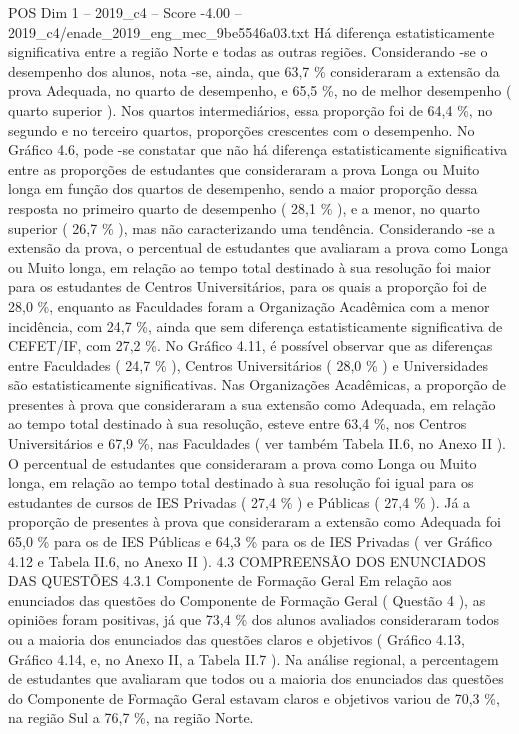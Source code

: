 \begin{textsample}{POS Dim 1 – 2019\_c4 – Score -4.00 – 2019\_c4/enade\_2019\_eng\_mec\_9be5546a03.txt}
Há diferença estatisticamente significativa entre a região Norte e todas as outras regiões.
Considerando -se o desempenho dos alunos, nota -se, ainda, que 63,7 \% consideraram a extensão da prova Adequada, no quarto de desempenho, e 65,5 \%, no de melhor desempenho ( quarto superior ).
Nos quartos intermediários, essa proporção foi de 64,4 \%, no segundo e no terceiro quartos, proporções crescentes com o desempenho.
No Gráfico 4.6, pode -se constatar que não há diferença estatisticamente significativa entre as proporções de estudantes que consideraram a prova Longa ou Muito longa em função dos quartos de desempenho, sendo a maior proporção dessa resposta no primeiro quarto de desempenho ( 28,1 \% ), e a menor, no quarto superior ( 26,7 \% ), mas não caracterizando uma tendência.
Considerando -se a extensão da prova, o percentual de estudantes que avaliaram a prova como Longa ou Muito longa, em relação ao tempo total destinado à sua resolução foi maior para os estudantes de Centros Universitários, para os quais a proporção foi de 28,0 \%, enquanto as Faculdades foram a Organização Acadêmica com a menor incidência, com 24,7 \%, ainda que sem diferença estatisticamente significativa de CEFET/IF, com 27,2 \%.
No Gráfico 4.11, é possível observar que as diferenças entre Faculdades ( 24,7 \% ), Centros Universitários ( 28,0 \% ) e Universidades são estatisticamente significativas.
Nas Organizações Acadêmicas, a proporção de presentes à prova que consideraram a sua extensão como Adequada, em relação ao tempo total destinado à sua resolução, esteve entre 63,4 \%, nos Centros Universitários e 67,9 \%, nas Faculdades ( ver também Tabela II.6, no Anexo II ).
O percentual de estudantes que consideraram a prova como Longa ou Muito longa, em relação ao tempo total destinado à sua resolução foi igual para os estudantes de cursos de IES Privadas ( 27,4 \% ) e Públicas ( 27,4 \% ).
Já a proporção de presentes à prova que consideraram a extensão como Adequada foi 65,0 \% para os de IES Públicas e 64,3 \% para os de IES Privadas ( ver Gráfico 4.12 e Tabela II.6, no Anexo II ). 4.3 COMPREENSÃO DOS ENUNCIADOS DAS QUESTÕES 4.3.1 Componente de Formação Geral Em relação aos enunciados das questões do Componente de Formação Geral ( Questão 4 ), as opiniões foram positivas, já que 73,4 \% dos alunos avaliados consideraram todos ou a maioria dos enunciados das questões claros e objetivos ( Gráfico 4.13, Gráfico 4.14, e, no Anexo II, a Tabela II.7 ).
Na análise regional, a percentagem de estudantes que avaliaram que todos ou a maioria dos enunciados das questões do Componente de Formação Geral estavam claros e objetivos variou de 70,3 \%, na região Sul a 76,7 \%, na região Norte.

\end{textsample}
